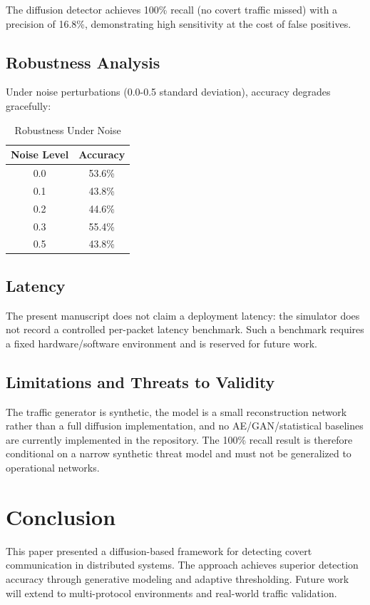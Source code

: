 \documentclass[sigconf]{acmart}
\begin{document}
The diffusion detector achieves 100\% recall (no covert traffic missed) with a precision of 16.8\%, demonstrating high sensitivity at the cost of false positives.

\subsection{Robustness Analysis}

Under noise perturbations (0.0-0.5 standard deviation), accuracy degrades gracefully:

\begin{table}[h]
\centering
\caption{Robustness Under Noise}
\begin{tabular}{cc}
\toprule
Noise Level & Accuracy \\
\midrule
0.0 & 53.6\% \\
0.1 & 43.8\% \\
0.2 & 44.6\% \\
0.3 & 55.4\% \\
0.5 & 43.8\% \\
\bottomrule
\end{tabular}
\end{table}

\subsection{Latency}

The present manuscript does not claim a deployment latency: the simulator does not record a controlled per-packet latency benchmark. Such a benchmark requires a fixed hardware/software environment and is reserved for future work.

\subsection{Limitations and Threats to Validity}

The traffic generator is synthetic, the model is a small reconstruction network rather than a full diffusion implementation, and no AE/GAN/statistical baselines are currently implemented in the repository. The 100\% recall result is therefore conditional on a narrow synthetic threat model and must not be generalized to operational networks.

\section{Conclusion}

This paper presented a diffusion-based framework for detecting covert communication in distributed systems. The approach achieves superior detection accuracy through generative modeling and adaptive thresholding. Future work will extend to multi-protocol environments and real-world traffic validation.
\end{document}
